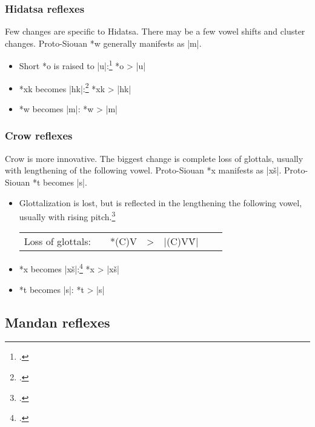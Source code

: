 \documentclass[output=paper]{LSP/langsci}
\begin{document}
\subsubsection{Hidatsa reflexes}

Few changes are specific to Hidatsa.  There may be a few vowel shifts and cluster changes.  Proto-Siouan *w generally manifests as |m|.

\begin{itemize}
\item Short *o is raised to |u|:\footnote{\citealt[137, 922]{CSD2006}.}	 \hspace{1em} *o	>	|u|
\item *xk becomes |hk|:\footnote{\citealt[193]{CSD2006}.} \hspace{3.2em}  *xk	>	|hk|
\item *w becomes |m|: \hspace{4.1em} *w	>	|m|
\end{itemize}

\subsubsection{Crow reflexes}

Crow is more innovative.  The biggest change is complete loss of glottals, usually with lengthening of the following vowel.  Proto-Siouan *x manifests as |xš|.  Proto-Siouan *t becomes |s|.

\begin{itemize}
\item Glottalization is lost, but is reflected in the lengthening the following vowel, usually with rising pitch.\footnote{\citealt[232]{CSD2006}.}



\begin{tabular}[t]{c c c c c c c}
Loss of glottals:	 & & *(C)\textsuperscript{\textipa{P}}V & > & |(C)V\'V|
\end{tabular}

\item *x becomes |xš|:\footnote{	\citealt[124]{CSD2006}.}	\hspace{1em} *x	>	|xš|
\item *t becomes |s|: \hspace{2em}  *t	>	|s|
\end{itemize}

\subsection{Mandan reflexes}
\end{document}

